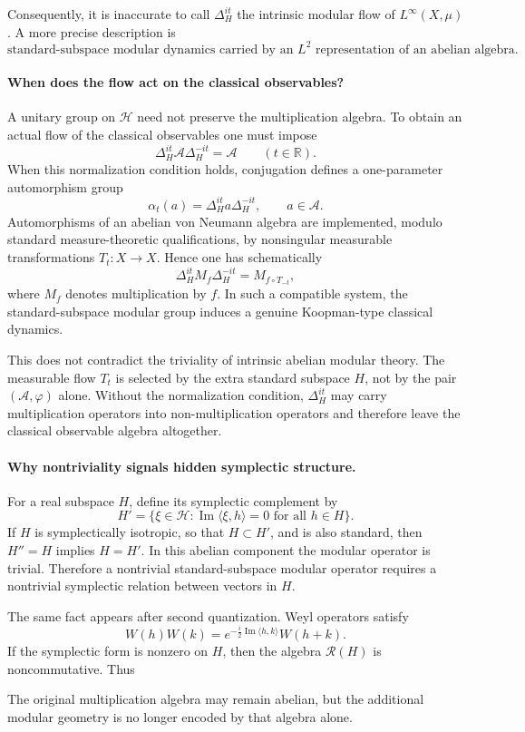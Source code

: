 \documentclass[a4paper,11pt]{article}
\theoremstyle{definition}
\newcommand{\cH}{\mathcal{H}}
\begin{document}
Consequently, it is inaccurate to call \(\Delta_H^{it}\) the intrinsic modular flow of \(L^\infty(X,\mu)\). A more precise description is
\[
    \boxed{\text{standard-subspace modular dynamics carried by an }L^2
    \text{ representation of an abelian algebra}.}
\]

\paragraph{When does the flow act on the classical observables?}
A unitary group on \(\cH\) need not preserve the multiplication algebra. To obtain an actual flow of the classical observables one must impose
\[
    \Delta_H^{it}\mathcal{A}\Delta_H^{-it}=\mathcal{A}
    \qquad (t\in\mathbb{R}).
\]
When this normalization condition holds, conjugation defines a one-parameter automorphism group
\[
    \alpha_t(a)=\Delta_H^{it}a\Delta_H^{-it},
    \qquad a\in\mathcal{A}.
\]
Automorphisms of an abelian von Neumann algebra are implemented, modulo standard measure-theoretic qualifications, by nonsingular measurable transformations \(T_t:X\to X\). Hence one has schematically
\[
    \Delta_H^{it}M_f\Delta_H^{-it}
    =M_{f\circ T_{-t}},
\]
where \(M_f\) denotes multiplication by \(f\). In such a compatible system, the standard-subspace modular group induces a genuine Koopman-type classical dynamics.

This does not contradict the triviality of intrinsic abelian modular theory. The measurable flow \(T_t\) is selected by the extra standard subspace \(H\), not by the pair \((\mathcal{A},\varphi)\) alone. Without the normalization condition, \(\Delta_H^{it}\) may carry multiplication operators into non-multiplication operators and therefore leave the classical observable algebra altogether.

\paragraph{Why nontriviality signals hidden symplectic structure.}
For a real subspace \(H\), define its symplectic complement by
\[
    H'=\{\xi\in\cH:\operatorname{Im}\langle\xi,h\rangle=0
    \text{ for all }h\in H\}.
\]
If \(H\) is symplectically isotropic, so that \(H\subset H'\), and is also standard, then \(H''=H\) implies \(H=H'\). In this abelian component the modular operator is trivial. Therefore a nontrivial standard-subspace modular operator requires a nontrivial symplectic relation between vectors in \(H\).

The same fact appears after second quantization. Weyl operators satisfy
\[
    W(h)W(k)
    =e^{-\frac{i}{2}\operatorname{Im}\langle h,k\rangle}W(h+k).
\]
If the symplectic form is nonzero on \(H\), then the algebra \(\mathcal{R}(H)\) is noncommutative. Thus
\begin{center}
\end{center}
The original multiplication algebra may remain abelian, but the additional modular geometry is no longer encoded by that algebra alone.
\end{document}
